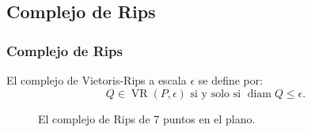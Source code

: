 \documentclass{beamer}
\DeclareMathOperator{\diam}{diam}
\DeclareMathOperator{\VR}{VR}
\begin{document}
\subsection{Complejo de Rips}

\begin{frame}\frametitle{Complejo de Rips}
  \begin{Definicion}
  El complejo de Vietoris-Rips a escala \(\epsilon\) se define por: 
    \begin{equation*}
      Q\in \VR(P,\epsilon) 
      \text{ si y solo si }
      \diam Q \le \epsilon.
    \end{equation*}
  \end{Definicion}

  \begin{figure}[H]
    \begin{columns}
    \centering{}
    \caption{El complejo de Rips de 7 puntos en el plano.}
    \end{columns}
  \end{figure}

\end{frame}
\end{document}

